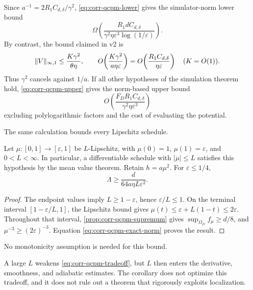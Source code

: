 Since $a^{-1}=2R_1C_{d,\delta}/\gamma^2$,
\cref{eq:corr-qcpm-lower} gives the simulator-norm lower bound
\begin{equation}
 \Omega\!\left(
  \frac{R_1dC_{d,\delta}}
       {\gamma^2\eta\varepsilon^3\log(1/\varepsilon)}
 \right).                                                \label{eq:corr-qcpm-complexity-scale}
\end{equation}
By contrast, the bound claimed in v2 is
\[
 \lVert V\rVert_{\infty,1}\leq\frac{K\gamma^2}{\theta\eta},
 \qquad
 O\!\left(\frac{K\gamma^2}{a\eta\varepsilon}\right)
 =O\!\left(\frac{R_1C_{d,\delta}}{\eta\varepsilon}\right)
 \quad(K=O(1)).
\]
Thus $\gamma^2$ cancels against $1/a$.  If all other hypotheses of the
simulation theorem hold, \eqref{eq:corr-qcpm-upper} gives the norm-based
upper bound
\[
 O\!\left(\frac{F_DR_1C_{d,\delta}}
 {\gamma^2\eta\varepsilon^3}\right)
\]
excluding polylogarithmic factors and the cost of evaluating the potential.

The same calculation bounds every Lipschitz schedule.

\begin{corollary}
\label{cor:corr-qcpm-tradeoff}
Let $\mu:[0,1]\to[\varepsilon,1]$ be $L$-Lipschitz, with
$\mu(0)=1$, $\mu(1)=\varepsilon$, and $0<L<\infty$.
In particular, a differentiable schedule with $|\dot\mu|\leq L$
satisfies this hypothesis by the mean value theorem.  Retain $h=a\mu^2$.  For
$\varepsilon\leq1/4$,
\begin{equation}
 \boxed{\Lambda\geq\frac{d}{64a\eta L\varepsilon^2}.}   \label{eq:corr-qcpm-tradeoff}
\end{equation}
\end{corollary}

\begin{proof}
The endpoint values imply $L\geq1-\varepsilon$, hence
$\varepsilon/L\leq1$.  On the terminal interval
$[1-\varepsilon/L,1]$, the Lipschitz bound gives
$\mu(t)\leq\varepsilon+L(1-t)\leq2\varepsilon$.  Throughout that interval,
\cref{prop:corr-qcpm-supremum} gives
$\sup_{\Omega_D} f_\mu\geq d/8$, and
$\mu^{-3}\geq(2\varepsilon)^{-3}$.  Equation
\eqref{eq:corr-qcpm-exact-norm} proves the result.
\end{proof}
No monotonicity assumption is needed for this bound.

A large $L$ weakens \eqref{eq:corr-qcpm-tradeoff}, but $L$ then enters the
derivative, smoothness, and adiabatic estimates.  The corollary does not
optimize this tradeoff, and it does not rule out a theorem that rigorously
exploits localization.

